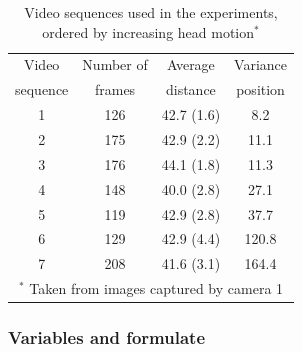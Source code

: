 \documentclass[twoside,twocolumn]{article}
\begin{document}
\begin{table}[thp]\footnotesize
\centering
\caption{Video sequences used in the experiments, ordered by increasing head motion$^\textbf{*}$ \citep{Deniz10}} \label{Table:1}
\addtolength{\tabcolsep}{4.8pt}
\begin{tabular*}{7.95cm}{cccc}
	\toprule[0.75pt]
	 Video   & Number of &  Average   &                   Variance                   \\
	sequence &  frames   &  distance  &                   position                   \\ 
	\midrule[0.5pt]
	   1     &    126    & 42.7 (1.6) &                     8.2                      \\
	   2     &    175    & 42.9 (2.2) &                     11.1                     \\
	   3     &    176    & 44.1 (1.8) &                     11.3                     \\
	   4     &    148    & 40.0 (2.8) &                     27.1                     \\
	   5     &    119    & 42.9 (2.8) &                     37.7                     \\
	   6     &    129    & 42.9 (4.4) &                    120.8                     \\
	   7     &    208    & 41.6 (3.1) &                    164.4                     \\ 
	\bottomrule[0.75pt]
	\multicolumn{4}{p{6cm}}{\scriptsize $^*$ Taken from images captured by camera 1}
\end{tabular*}
\end{table}


\subsubsection{Variables and formulate}
\end{document}
